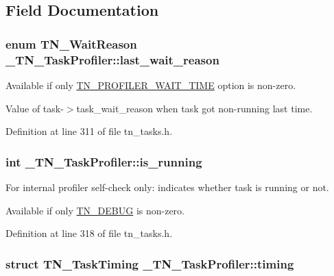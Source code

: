 \subsection{Field Documentation}
\hypertarget{struct__TN__TaskProfiler_aa587d29f8b4a5252547dc3144735ea55}{
\subsubsection[{last\+\_\+wait\+\_\+reason}]{\setlength{\rightskip}{0pt plus 5cm}enum {\bf T\+N\+\_\+\+Wait\+Reason} \+\_\+\+T\+N\+\_\+\+Task\+Profiler\+::last\+\_\+wait\+\_\+reason}}\label{struct__TN__TaskProfiler_aa587d29f8b4a5252547dc3144735ea55}


Available if only {\ttfamily \hyperlink{tn__cfg__default_8h_a1c04db5457adb54f7cc38d42b29a5ad7}{T\+N\+\_\+\+P\+R\+O\+F\+I\+L\+E\+R\+\_\+\+W\+A\+I\+T\+\_\+\+T\+I\+M\+E}} option is non-\/zero. 

Value of {\ttfamily task-\/$>$task\+\_\+wait\+\_\+reason} when task got non-\/running last time. 

Definition at line 311 of file tn\+\_\+tasks.\+h.

\hypertarget{struct__TN__TaskProfiler_a4e382a368f456602d74dad640e6371ba}{
\subsubsection[{is\+\_\+running}]{\setlength{\rightskip}{0pt plus 5cm}int \+\_\+\+T\+N\+\_\+\+Task\+Profiler\+::is\+\_\+running}}\label{struct__TN__TaskProfiler_a4e382a368f456602d74dad640e6371ba}


For internal profiler self-\/check only\+: indicates whether task is running or not. 

Available if only {\ttfamily \hyperlink{tn__cfg__default_8h_a9d2b6d902efdbc56094bb913413aa69c}{T\+N\+\_\+\+D\+E\+B\+U\+G}} is non-\/zero. 

Definition at line 318 of file tn\+\_\+tasks.\+h.

\hypertarget{struct__TN__TaskProfiler_a49e7b961e080414f407f5c52f9688ed5}{
\subsubsection[{timing}]{\setlength{\rightskip}{0pt plus 5cm}struct {\bf T\+N\+\_\+\+Task\+Timing} \+\_\+\+T\+N\+\_\+\+Task\+Profiler\+::timing}}\label{struct__TN__TaskProfiler_a49e7b961e080414f407f5c52f9688ed5}


